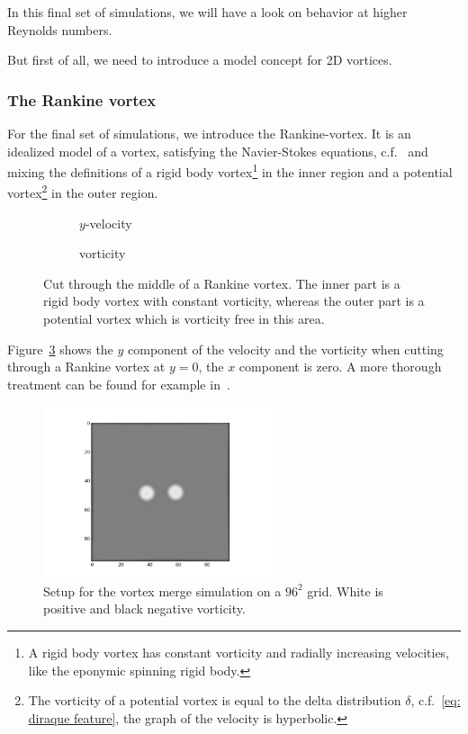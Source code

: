 
In this final set of simulations, we will have a look on behavior at higher Reynolds numbers.

But first of all, we need to introduce a model concept for 2D vortices.

\subsubsection{The Rankine vortex}
\label{subs:The Rankine vortex}

For the final set of simulations, we introduce the Rankine-vortex.
It is an idealized model of a vortex, satisfying the Navier-Stokes equations, c.f.~\cite{tryggeson2007analytical} and mixing the definitions of a rigid body vortex\footnote{A rigid body vortex has constant vorticity and radially increasing velocities, like the eponymic spinning rigid body.}
in the inner region and a potential vortex\footnote{The vorticity of a potential vortex is equal to the delta distribution $\delta$, c.f.~\eqref{eq: diraque feature}, the graph of the velocity is hyperbolic.} in the outer region.


\begin{figure}
\centering
\begin{subfigure}[b]{.5\textwidth}
  \centering
  
  \caption{$y$-velocity}
\label{fig: rankine velocity}
\end{subfigure}%
\begin{subfigure}[b]{.5\textwidth}
  \centering
  
  \caption{vorticity}
\label{fig: rankine vorticity}
\end{subfigure}
\caption{Cut through the middle of a Rankine vortex.
The inner part is a rigid body vortex with constant vorticity, whereas the outer part is a potential vortex which is vorticity free in this area.}
\label{fig: rankine}
\end{figure}

Figure~\ref{fig: rankine} shows the $y$ component of the velocity and the vorticity when cutting through a Rankine vortex at $y=0$, the $x$ component is zero.
A more thorough treatment can be found for example in~\cite{giaiotti2006rankine}.

\begin{figure}
  \centering
  \includegraphics[width=0.6\textwidth]{../figures/rankine_vortex.png}  %
  \caption{Setup for the vortex merge simulation on a $96^2$ grid. White is positive and black negative vorticity.}
\label{fig: vortex merge setup}
\end{figure}

